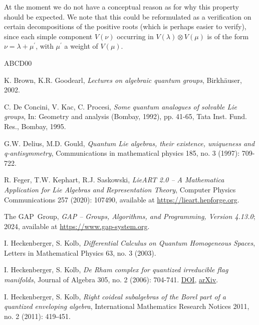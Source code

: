 \documentclass[a4paper, 12pt, reqno, english]{amsart}
\numberwithin{equation}{section}
\numberwithin{figure}{section}
\theoremstyle{plain}
\theoremstyle{plain}
\theoremstyle{plain}
\theoremstyle{plain}
\theoremstyle{plain}
\theoremstyle{definition}
\theoremstyle{definition}
\theoremstyle{definition}
\theoremstyle{remark}
\theoremstyle{definition}
\theoremstyle{definition}
\begin{document}
At the moment we do not have a conceptual reason as for why this property should be expected.
We note that this could be reformulated as a verification on certain decompositions of the positive roots (which is perhaps easier to verify), since each simple component $V(\nu)$ occurring in $V(\lambda) \otimes V(\mu)$ is of the form $\nu = \lambda + \mu^\prime$, with $\mu^\prime$ a weight of $V(\mu)$.

\begin{thebibliography}{ABCD00}

\providecommand{\DOI}[1]{\href{https://doi.org/#1}{DOI}}
\providecommand{\arxiv}[1]{\href{http://arxiv.org/abs/#1}{arXiv}}

K. Brown, K.R. Goodearl,
\textit{Lectures on algebraic quantum groups},
Birkhäuser, 2002.

C. De Concini, V. Kac, C. Procesi,
\textit{Some quantum analogues of solvable Lie groups},
In: Geometry and analysis (Bombay, 1992), pp. 41-65, Tata Inst. Fund. Res., Bombay, 1995.

G.W. Delius, M.D. Gould,
\textit{Quantum Lie algebras, their existence, uniqueness and q-antisymmetry},
Communications in mathematical physics 185, no. 3 (1997): 709-722.

R. Feger, T.W. Kephart, R.J. Saskowski,
\textit{LieART 2.0 – A Mathematica Application for Lie Algebras and Representation Theory},
Computer Physics Communications 257 (2020): 107490, available at \url{https://lieart.hepforge.org}.

The GAP~Group, \emph{GAP -- Groups, Algorithms, and Programming, Version 4.13.0}; 2024, available at \url{https://www.gap-system.org}.

I. Heckenberger, S. Kolb,
\textit{Differential Calculus on Quantum Homogeneous Spaces},
Letters in Mathematical Physics 63, no. 3 (2003).

I. Heckenberger, S. Kolb,
\textit{De Rham complex for quantized irreducible flag manifolds},
Journal of Algebra 305, no. 2 (2006): 704-741.
\DOI{10.1016/j.jalgebra.2006.02.001}, \arxiv{math/0307402}.

I. Heckenberger, S. Kolb,
\textit{Right coideal subalgebras of the Borel part of a quantized enveloping algebra},
International Mathematics Research Notices 2011, no. 2 (2011): 419-451.


\end{thebibliography}
\end{document}

